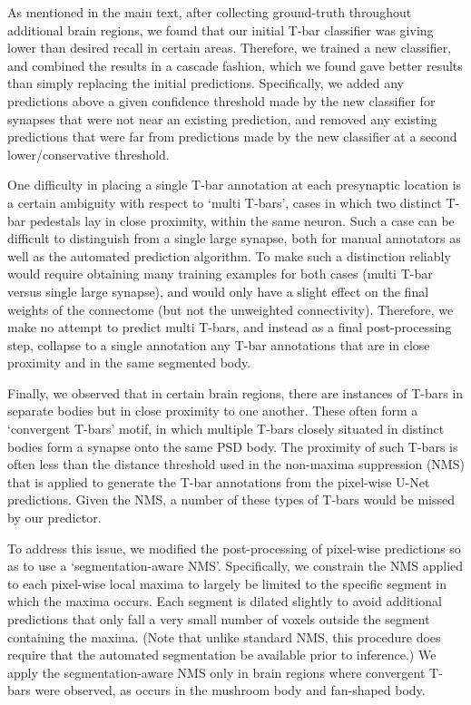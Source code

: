 \documentclass{article}
\begin{document}
As mentioned in the main text, after collecting ground-truth throughout additional brain regions, we found that our initial T-bar classifier was giving lower than desired recall in certain areas. Therefore, we trained a new classifier, and combined the results in a cascade fashion, which we found gave better results than simply replacing the initial predictions. Specifically, we added any predictions above a given confidence threshold made by the new classifier for synapses that were not near an existing prediction, and removed any existing predictions that were far from predictions made by the new classifier at a second lower/conservative threshold.

One difficulty in placing a single T-bar annotation at each presynaptic location is a certain ambiguity with respect to ‘multi T-bars’, cases in which two distinct T-bar pedestals lay in close proximity, within the same neuron. Such a case can be difficult to distinguish from a single large synapse, both for manual annotators as well as the automated prediction algorithm. To make such a distinction reliably would require obtaining many training examples for both cases (multi T-bar versus single large synapse), and would only have a slight effect on the final weights of the connectome (but not the unweighted connectivity). Therefore, we make no attempt to predict multi T-bars, and instead as a final post-processing step, collapse to a single annotation any T-bar annotations that are in close proximity and in the same segmented body.

Finally, we observed that in certain brain regions, there are instances of T-bars in separate bodies but in close proximity to one another. These often form a ‘convergent T-bars’ motif, in which multiple T-bars closely situated in distinct bodies form a synapse onto the same PSD body. The proximity of such T-bars is often less than the distance threshold used in the non-maxima suppression (NMS) that is applied to generate the T-bar annotations from the pixel-wise U-Net predictions. Given the NMS, a number of these types of T-bars would be missed by our predictor.

To address this issue, we modified the post-processing of pixel-wise predictions so as to use a ‘segmentation-aware NMS’. Specifically, we constrain the NMS applied to each pixel-wise local maxima to largely be limited to the specific segment in which the maxima occurs. Each segment is dilated slightly to avoid additional predictions that only fall a very small number of voxels outside the segment containing the maxima. (Note that unlike standard NMS, this procedure does require that the automated segmentation be available prior to inference.) We apply the segmentation-aware NMS only in brain regions where convergent T-bars were observed, as occurs in the mushroom body and fan-shaped body.
\end{document}
